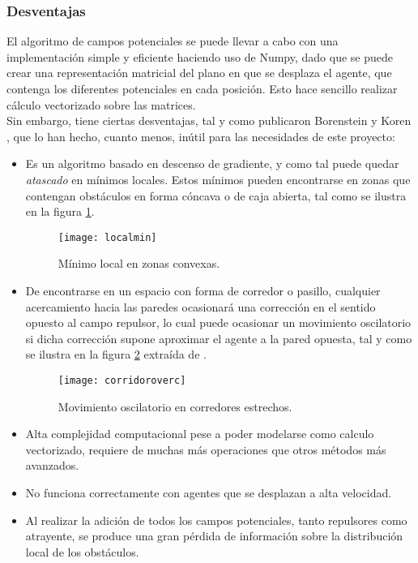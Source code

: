  \newpage
\subsubsection{Desventajas}
El algoritmo de campos potenciales se puede llevar a cabo con una implementación simple y eficiente haciendo uso de Numpy, dado que se puede crear una representación matricial del plano en que se desplaza el agente, que contenga los diferentes potenciales en cada posición. 
Esto hace sencillo realizar cálculo vectorizado sobre las matrices. \\Sin embargo, tiene ciertas desventajas, tal y como publicaron Borenstein y Koren \citep{art:BorensteinLims}, que lo han hecho, cuanto menos, inútil para las necesidades de este proyecto:
\begin{itemize}
\item Es un algoritmo basado en descenso de gradiente, y como tal puede quedar \textit{atascado} en mínimos locales. Estos mínimos pueden encontrarse en zonas que contengan obstáculos en forma cóncava o de caja abierta, tal como se ilustra en la figura \ref{fig:localmin}.
\begin{figure}[H]
	\centering
	\texttt{[image: localmin]}
	\caption{Mínimo local en zonas convexas.}\label{fig:localmin}
\end{figure}
\item \label{subsec:PFlims} De encontrarse en un espacio con forma de corredor o pasillo, cualquier acercamiento hacia las paredes ocasionará una corrección en el sentido opuesto al campo repulsor, lo cual puede ocasionar un movimiento oscilatorio si dicha corrección supone aproximar el agente a la pared opuesta, tal y como se ilustra en la figura \ref{fig:corridoroverc} extraída de \citep{art:BorensteinLims}.
\begin{figure}[H]
	\centering
	\texttt{[image: corridoroverc]}
	\caption{Movimiento oscilatorio en corredores estrechos.}\label{fig:corridoroverc}
\end{figure}
\item Alta complejidad computacional pese a poder modelarse como calculo vectorizado, requiere de muchas más operaciones que otros métodos más avanzados.
\item No funciona correctamente con agentes que se desplazan a alta velocidad. 
\item Al realizar la adición de todos los campos potenciales, tanto repulsores como atrayente, se produce una gran pérdida de información sobre la distribución local de los obstáculos.
\end{itemize} 

